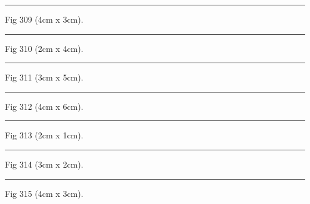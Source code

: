 \documentclass[a4paper,11pt]{article}
\begin{document}
\begin{swarmwrap}%
  \begin{minipage}[t]{4cm}
    \centering
    \rule{\linewidth}{3cm}
    {\footnotesize Fig 309 (4cm x 3cm).}
  \end{minipage}%
\end{swarmwrap}%
\swarmwrapnext
\lipsum[9]%

\begin{swarmwrap}%
  \begin{minipage}[t]{2cm}
    \centering
    \rule{\linewidth}{4cm}
    {\footnotesize Fig 310 (2cm x 4cm).}
  \end{minipage}%
\end{swarmwrap}%
\swarmwrapnext
\lipsum[10]%

\begin{swarmwrap}%
  \begin{minipage}[t]{3cm}
    \centering
    \rule{\linewidth}{5cm}
    {\footnotesize Fig 311 (3cm x 5cm).}
  \end{minipage}%
\end{swarmwrap}%
\swarmwrapnext
\lipsum[11]%

\begin{swarmwrap}%
  \begin{minipage}[t]{4cm}
    \centering
    \rule{\linewidth}{6cm}
    {\footnotesize Fig 312 (4cm x 6cm).}
  \end{minipage}%
\end{swarmwrap}%
\swarmwrapnext
\lipsum[12]%

\begin{swarmwrap}%
  \begin{minipage}[t]{2cm}
    \centering
    \rule{\linewidth}{1cm}
    {\footnotesize Fig 313 (2cm x 1cm).}
  \end{minipage}%
\end{swarmwrap}%
\swarmwrapnext
\lipsum[13]%

\begin{swarmwrap}%
  \begin{minipage}[t]{3cm}
    \centering
    \rule{\linewidth}{2cm}
    {\footnotesize Fig 314 (3cm x 2cm).}
  \end{minipage}%
\end{swarmwrap}%
\swarmwrapnext
\lipsum[14]%

\begin{swarmwrap}%
  \begin{minipage}[t]{4cm}
    \centering
    \rule{\linewidth}{3cm}
    {\footnotesize Fig 315 (4cm x 3cm).}
  \end{minipage}%
\end{swarmwrap}%
\swarmwrapnext
\lipsum[15]%
\end{document}
